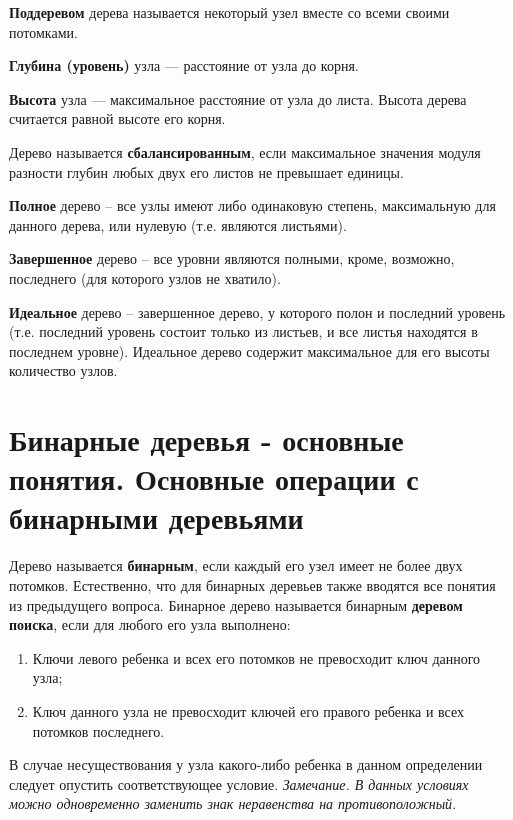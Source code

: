 \textbf{Поддеревом} дерева называется некоторый узел вместе со всеми своими потомками.

\textbf{Глубина (уровень)} узла --- расстояние от узла до корня.

\textbf{Высота} узла --- максимальное расстояние от узла до листа. Высота дерева считается
равной высоте его корня.

Дерево называется \textbf{сбалансированным}, если максимальное значения модуля разности глубин
любых двух его листов не превышает единицы.

\textbf{Полное} дерево – все узлы имеют либо одинаковую степень, максимальную для данного дерева, или нулевую (т.е. являются
листьями).

\textbf{Завершенное} дерево – все уровни являются полными, кроме, возможно, последнего (для которого узлов не хватило).

\textbf{Идеальное} дерево – завершенное дерево, у которого полон и последний уровень (т.е. последний уровень состоит
только из листьев, и все листья находятся в последнем уровне). Идеальное дерево содержит максимальное для его высоты
количество узлов.


\section{Бинарные деревья - основные понятия. Основные операции с бинарными деревьями}
Дерево называется \textbf{бинарным}, если каждый его узел имеет не более двух потомков.
Естественно, что для бинарных деревьев также вводятся все понятия из предыдущего вопроса.
\label{def:bst}
Бинарное дерево называется бинарным \textbf{деревом поиска}, если для любого его узла выполнено:
\begin{enumerate}
  \item Ключи левого ребенка и всех его потомков не превосходит ключ данного узла;
  \item Ключ данного узла не превосходит ключей его правого ребенка и всех потомков последнего.
\end{enumerate}
В случае несуществования у узла какого-либо ребенка в данном определении следует опустить соответствующее условие.
{\small\itshape Замечание. В данных условиях можно одновременно заменить знак неравенства на противоположный.}

